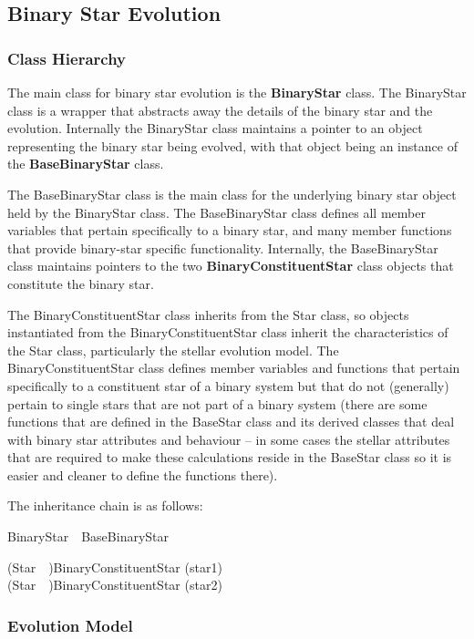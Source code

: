 \subsection{Binary Star Evolution}\label{sec:BinaryStarEvolution}

\subsubsection{Class Hierarchy}\label{sec:BSEClassHierarchy}

The main class for binary star evolution is the \textbf{BinaryStar} class.  The BinaryStar class is a wrapper that abstracts away the details of the binary star and the evolution.  Internally the BinaryStar class maintains a pointer to an object representing the binary star being evolved, with that object being an instance of the \textbf{BaseBinaryStar} class.

The BaseBinaryStar class is the main class for the underlying binary star object held by the BinaryStar class.  The BaseBinaryStar class defines all member variables that pertain specifically to a binary star, and many member functions that provide binary-star specific functionality.  Internally, the BaseBinaryStar class maintains pointers to the two \textbf{BinaryConstituentStar} class objects that constitute the binary star.

The BinaryConstituentStar class inherits from the Star class, so objects instantiated from the BinaryConstituentStar class inherit the characteristics of the Star class, particularly the stellar evolution model.  The BinaryConstituentStar class defines member variables and functions that pertain specifically to a constituent star of a binary system but that do not (generally) pertain to single stars that are not part of a binary system (there are some functions that are defined in the BaseStar class and its derived classes that deal with binary star attributes and behaviour -- in some cases the stellar attributes that are required to make these calculations reside in the BaseStar class so it is easier and cleaner to define the functions there).

The inheritance chain is as follows:

BinaryStar\ \rarr\ BaseBinaryStar

\tabto{2em}(Star\ \rarr\ )\tabto{7em}BinaryConstituentStar (star1) \\
\tabto{2em}(Star\ \rarr\ )\tabto{7em}BinaryConstituentStar (star2)


\newpage
\subsubsection{Evolution Model}\label{sec:BSE_EvolutionModel} 

